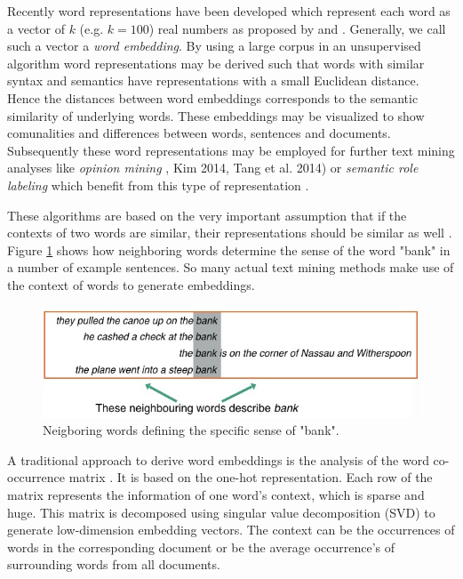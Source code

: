 Recently word representations have been developed which represent each word as a vector of $k$ (e.g. $k=100$) real numbers as proposed by \citep{CollobertWeston2008} and  \citep{MikolovSutskeverEtAl2013}. Generally, we call such a vector a \emph{word embedding}. By using a large corpus in an unsupervised algorithm word representations may be derived such that words with similar syntax and semantics have representations with a small Euclidean distance. Hence the distances between word embeddings corresponds to the semantic similarity of underlying words. These embeddings may be visualized to show comunalities and differences between words, sentences and documents. Subsequently these word representations may be employed for further text mining analyses like \emph{opinion mining} \citep{SocherPerelyginEtAl2013}, Kim 2014, Tang et al. 2014) or \emph{semantic role labeling} \citep{ZhouXu2015} which benefit from this type of representation \citep{CollobertWestonEtAl2011}.

These algorithms are based on the very important assumption that if the contexts of two words are similar, their representations should be similar as well \citep{Harris1954}. Figure \ref{fig:neighbouring_words} shows how neighboring words determine the sense of the word "bank" in a number of example sentences. So many actual text mining methods make use of the context of words to generate embeddings. 
\begin{figure}[H]
\centering
\begin{minipage}{1.0\textwidth}
 
	\includegraphics[width=1.0\textwidth]{neighbouring_words} 
	
\end{minipage}%
\label{fig:neighbouring_words}
\caption{Neigboring words defining the specific sense of "bank".}
\end{figure}	
A traditional approach to derive word embeddings is the analysis of the  word co-occurrence matrix \citep{DeerwesterDumaisEtAl1990}. It is based on the one-hot representation. Each row of the matrix represents the information of one word's context, which is sparse and huge. This matrix is decomposed using  singular value decomposition (SVD) to generate low-dimension embedding vectors. The context can be the occurrences of words in the corresponding document  or be the average occurrence's of surrounding words from all documents. 


